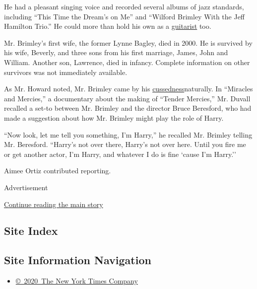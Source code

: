 He had a pleasant singing voice and recorded several albums of jazz
standards, including ``This Time the Dream's on Me'' and ``Wilford
Brimley With the Jeff Hamilton Trio.'' He could more than hold his own
as a \href{https://www.youtube.com/watch?v=WAft2naOgGc}{guitarist} too.

Mr. Brimley's first wife, the former Lynne Bagley, died in 2000. He is
survived by his wife, Beverly, and three sons from his first marriage,
James, John and William. Another son, Lawrence, died in infancy.
Complete information on other survivors was not immediately available.

As Mr. Howard noted, Mr. Brimley came by his
\href{https://www.youtube.com/watch?v=DLqX7Vi9yT8\&list=PLy1Yuw2wBXtCMd3A4mbt2x4Z8ty3S_YFF}{cussedness}naturally.
In ``Miracles and Mercies,'' a documentary about the making of ``Tender
Mercies,'' Mr. Duvall recalled a set-to between Mr. Brimley and the
director Bruce Beresford, who had made a suggestion about how Mr.
Brimley might play the role of Harry.

``Now look, let me tell you something, I'm Harry,'' he recalled Mr.
Brimley telling Mr. Beresford. ``Harry's not over there, Harry's not
over here. Until you fire me or get another actor, I'm Harry, and
whatever I do is fine `cause I'm Harry.''

Aimee Ortiz contributed reporting.

Advertisement

\protect\hyperlink{after-bottom}{Continue reading the main story}

\hypertarget{site-index}{%
\subsection{Site Index}\label{site-index}}

\hypertarget{site-information-navigation}{%
\subsection{Site Information
Navigation}\label{site-information-navigation}}

\begin{itemize}
\tightlist
\item
  \href{https://help.nytimes.com/hc/en-us/articles/115014792127-Copyright-notice}{©~2020~The
  New York Times Company}
\end{itemize}

